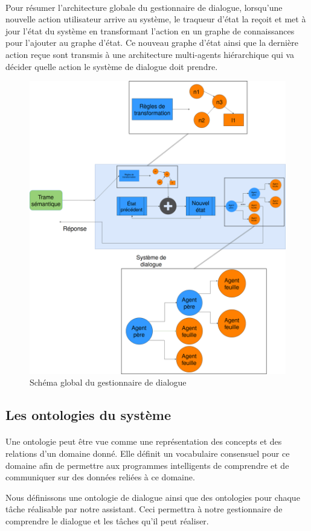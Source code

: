 \paragraph{}
Pour résumer l'architecture globale du gestionnaire de dialogue, lorsqu'une nouvelle action utilisateur arrive au système, le traqueur d'état la reçoit et met à jour l'état du système en transformant l'action en un graphe de connaissances pour l'ajouter au graphe d'état. Ce nouveau graphe d'état ainsi que la dernière action reçue sont transmis à une architecture multi-agents hiérarchique qui va décider quelle action le système de dialogue doit prendre.
\begin{figure}[H] 
	
	\centering
	\includegraphics[width=0.88\linewidth]{images/Conception/DM/globalDM.png}
	\caption{Schéma global du gestionnaire de dialogue}
\end{figure}\label{globalDM}
\subsection{Les ontologies du système}\label{onto}
\paragraph{}Une ontologie peut être vue comme une représentation des concepts et des relations d'un domaine donné. Elle définit un vocabulaire consensuel pour ce domaine afin de permettre aux programmes intelligents de comprendre  et de communiquer sur des données reliées à ce domaine.
\par Nous définissons une ontologie de dialogue ainsi que des ontologies pour chaque tâche réalisable par notre assistant. Ceci permettra à notre gestionnaire de comprendre le dialogue et les tâches qu'il peut réaliser.
